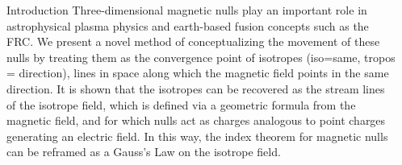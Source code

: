 \documentclass[final]{beamer}
\newlength{\sepwid}
\newlength{\onecolwid}
\begin{document}
\begin{frame}[t]
\begin{columns}[t]

\begin{column}{\sepwid}\end{column} %

\begin{column}{\onecolwid} %

\begin{block}{\huge{Introduction}}
	Three-dimensional magnetic nulls play an important role in astrophysical
	plasma physics and earth-based fusion concepts such as the FRC. 
	We present a novel method of conceptualizing the movement of these nulls by treating
        them as the convergence point of isotropes (iso=same, tropos = direction), lines in space
	along which the magnetic field points in the same direction. 
	It is shown that the isotropes can be recovered as the stream lines of
	the isotrope field, which is defined via a geometric formula from the
	magnetic field, and for which nulls act as charges analogous to point charges generating
        an electric field. In this way, the index theorem for magnetic nulls can be reframed as a Gauss's Law
        on the isotrope field. 
	
\end{block}


\end{column}
\end{columns}
\end{frame}
\end{document}
